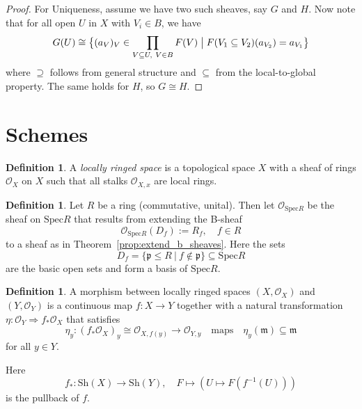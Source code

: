\documentclass{scrartcl}
\newcommand{\Spec}{\mathrm{Spec}}
\renewcommand{\O}{\mathcal{O}}
\theoremstyle{definition}
\newtheorem{definition}[prop]{Definition}
\begin{document}
\begin{proof}
    For Uniqueness, assume we have two such sheaves, say $G$ and $H$.
    Now note that for all open $U$ in $X$ with $V_i \in B$, we have
    \begin{equation*}
        G(U) \cong \bigl\{ (a_V)_V \in \prod_{V \subseteq U, \ V \in B} F(V) \bigm| F(V_1 \subseteq V_2)(a_{V_2}) = a_{V_1} \bigr\}
    \end{equation*}
    where $\supseteq$ follows from general structure and $\subseteq$ from the local-to-global property.
    The same holds for $H$, so $G \cong H$.
\end{proof}

\section{Schemes}
\begin{definition}
    A \emph{locally ringed space} is a topological space $X$ with a sheaf of rings $\O_X$ on $X$ such that all stalks $\O_{X, x}$ are local rings.
\end{definition}
\begin{definition}
    Let $R$ be a ring (commutative, unital).
    Then let $\O_{\Spec R}$ be the sheaf on $\Spec R$ that results from extending the B-sheaf
    \begin{equation*}
        \O_{\Spec R}(D_f) := R_f, \quad f \in R
    \end{equation*}
    to a sheaf as in Theorem~\ref{prop:extend_b_sheaves}.
    Here the sets
    \begin{equation*}
        D_f = \{ \mathfrak{p} \leq R \ | \ f \notin \mathfrak{p} \} \subseteq \Spec R
    \end{equation*}
    are the basic open sets and form a basis of $\Spec R$.
\end{definition}
\begin{definition}
    A morphism between locally ringed spaces $(X, \O_X)$ and $(Y, \O_Y)$ is a continuous map $f: X \to Y$ together with a natural transformation $\eta: \O_Y \Rightarrow f_*\O_X$ that satisfies
    \begin{equation*}
        \eta_y: (f_*\O_X)_y \cong \O_{X, f(y)} \to \O_{Y, y} \quad \text{maps} \quad \eta_y(\mathfrak{m}) \subseteq \mathfrak{m}
    \end{equation*}
    for all $y \in Y$.

    Here
    \begin{equation*}
        f_*: \mathrm{Sh}(X) \to \mathrm{Sh}(Y), \quad F \mapsto (U \mapsto F(f^{-1}(U)))
    \end{equation*}
    is the pullback of $f$.
\end{definition}
\end{document}
